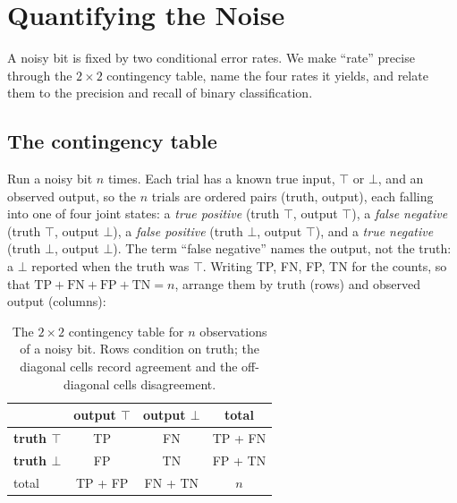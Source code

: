%
%
%
%
%

\section{Quantifying the Noise}
\label{sec:quantifying-noise}

A noisy bit is fixed by two conditional error rates. We make ``rate'' precise
through the $2 \times 2$ contingency table, name the four rates it yields, and
relate them to the precision and recall of binary classification.

\subsection*{The contingency table}

Run a noisy bit $n$ times. Each trial has a known true input, $\top$ or $\bot$,
and an observed output, so the $n$ trials are ordered pairs (truth, output),
each falling into one of four joint states: a \emph{true positive} (truth
$\top$, output $\top$), a \emph{false negative} (truth $\top$, output $\bot$),
a \emph{false positive} (truth $\bot$, output $\top$), and a \emph{true
negative} (truth $\bot$, output $\bot$). The term ``false negative'' names the
output, not the truth: a $\bot$ reported when the truth was $\top$. Writing TP,
FN, FP, TN for the counts, so that $\mathrm{TP} + \mathrm{FN} + \mathrm{FP} +
\mathrm{TN} = n$, arrange them by truth (rows) and observed output (columns):

\begin{table}[ht]
\centering
\begin{tabular}{l|cc|c}
\hline
              & \textbf{output $\top$} & \textbf{output $\bot$} & total \\
\hline
\textbf{truth $\top$} & TP & FN & TP + FN \\
\textbf{truth $\bot$} & FP & TN & FP + TN \\
\hline
total         & TP + FP & FN + TN & $n$ \\
\hline
\end{tabular}
\caption{The $2 \times 2$ contingency table for $n$ observations of a noisy
bit. Rows condition on truth; the diagonal cells record agreement and the
off-diagonal cells disagreement.}
\label{tab:contingency}
\end{table}

